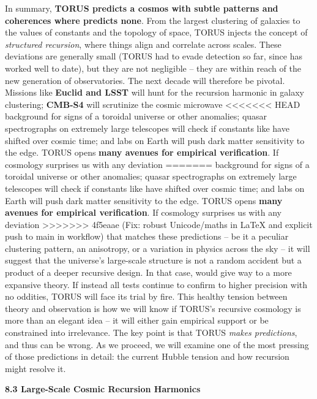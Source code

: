 \documentclass[]{article}
\begin{document}
In summary, \textbf{TORUS predicts a cosmos with subtle patterns and
coherences where  predicts none}. From the largest clustering of
galaxies to the values of constants and the topology of space, TORUS
injects the concept of \emph{structured recursion}, where things align
and correlate across scales. These deviations are generally small (TORUS
had to evade detection so far, since  has worked well to date), but
they are not negligible -- they are within reach of the new generation
of observatories. The next decade will therefore be pivotal. Missions
like \textbf{Euclid and LSST} will hunt for the recursion harmonic in
galaxy clustering; \textbf{CMB-S4} will scrutinize the cosmic microwave
<<<<<<< HEAD
background for signs of a toroidal universe or other
anomalies\hspace{0pt}; quasar spectrographs on extremely large
telescopes will check if constants like \alpha have shifted over cosmic
time\hspace{0pt}; and labs on Earth will push dark matter sensitivity to
the edge. TORUS opens \textbf{many avenues for empirical
verification}\hspace{0pt}. If cosmology surprises us with any deviation
=======
background for signs of a toroidal universe or other anomalies​; quasar
spectrographs on extremely large telescopes will check if constants like
\alpha have shifted over cosmic time​; and labs on Earth will push dark
matter sensitivity to the edge. TORUS opens \textbf{many avenues for
empirical verification}​. If cosmology surprises us with any deviation
>>>>>>> 4f5eaae (Fix: robust Unicode/maths in LaTeX and explicit push to main in workflow)
that matches these predictions -- be it a peculiar clustering pattern,
an anisotropy, or a variation in physics across the sky -- it will
suggest that the universe's large-scale structure is not a random
accident but a product of a deeper recursive design. In that case, 
would give way to a more expansive theory. If instead all tests continue
to confirm  to higher precision with no oddities, TORUS will face
its trial by fire. This healthy tension between theory and observation
is how we will know if TORUS's recursive cosmology is more than an
elegant idea -- it will either gain empirical support or be constrained
into irrelevance. The key point is that TORUS \emph{makes predictions},
and thus can be wrong. As we proceed, we will examine one of the most
pressing of those predictions in detail: the current Hubble tension and
how recursion might resolve it.

\textbf{8.3 Large-Scale Cosmic Recursion Harmonics}
\end{document}
